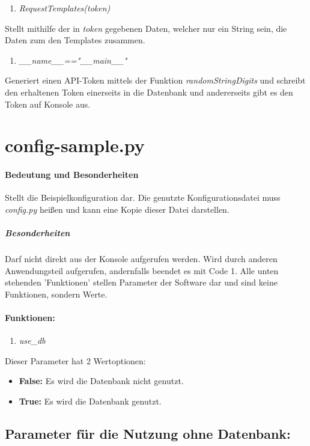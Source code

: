 \documentclass[12pt,parskip=full, pagea4]{scrreprt}
\begin{document}
			\begin{enumerate}[resume]
				\item \textit{RequestTemplates(token)}
			\end{enumerate}
			\leftskip=1.5cm	Stellt mithilfe der in \textit{token} gegebenen Daten, welcher nur ein String sein, die Daten zum den Templates zusammen. 
			\begin{enumerate}[resume]
				\item \textit{\_\_name\_\_=="\_\_main\_\_"}	
			\end{enumerate}
			\leftskip=1.5cm	Generiert einen API-Token mittels der Funktion \textit{randomStringDigits} und schreibt den erhaltenen Token einerseits in die Datenbank und andererseits gibt es den Token auf Konsole aus.
			
			\leftskip=0cm
			\section{config-sample.py}
			\paragraph{Bedeutung und Besonderheiten}Stellt die Beispielkonfiguration dar. Die genutzte Konfigurationsdatei muss \textit{config.py} heißen und kann eine Kopie dieser Datei darstellen.
			\subparagraph{Besonderheiten}Darf nicht direkt aus der Konsole aufgerufen werden. Wird durch anderen Anwendungsteil aufgerufen, andernfalls beendet es mit Code 1. Alle unten stehenden 'Funktionen' stellen Parameter der Software dar und sind keine Funktionen, sondern Werte.
			\paragraph{Funktionen:}
			\begin{enumerate}
				\item \textit{use\_db} 
			\end{enumerate}
			\leftskip=1.5cm Dieser Parameter hat 2 Wertoptionen:
			\begin{itemize}
				\item \leftskip=1.5cm \textbf{False:} Es wird die Datenbank nicht genutzt.
				\item \leftskip=1.5cm \textbf{True:} Es wird die Datenbank genutzt.
			\end{itemize}
			\subsection{Parameter für die Nutzung ohne Datenbank:}
\end{document}
